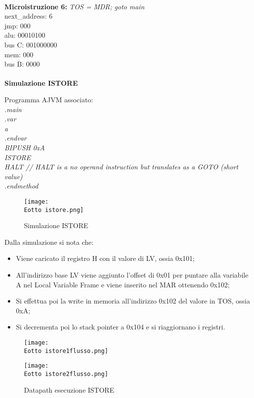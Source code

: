 \documentclass[12pt]{article}
\def \Eotto {Allegati/Esercizio8/}
\begin{document}
\\ \textbf{Microistruzione 6:}	\hspace*{1cm} \textit{TOS = MDR; goto main}
\\\hspace*{1cm} next\_address: 6
\\\hspace*{1cm} jmp: 000
\\\hspace*{1cm} alu: 00010100
\\\hspace*{1cm} bus C: 001000000
\\\hspace*{1cm} mem: 000
\\\hspace*{1cm} bus B: 0000
\\\\{\large \textbf{Simulazione ISTORE}}

\vspace{0.5cm}
Programma AJVM associato:
\textit{
    \\.main
    \\.var
    \\a
    \\.endvar
    \\BIPUSH 0xA
    \\ISTORE
    \\HALT // HALT is a no operand instruction but translates as a GOTO (short value)
    \\.endmethod
}
\clearpage
\begin{figure}[ht]
    \centering
    \texttt{[image: \\Eotto istore.png]}
    \caption{Simulazione ISTORE}
\end{figure}
Dalla simulazione si nota che:
\begin{itemize}
    \item Viene caricato il registro H con il valore di LV, ossia 0x101;
    \item All’indirizzo base LV viene aggiunto l’offset di 0x01 per puntare alla variabile A nel Local Variable Frame e viene inserito nel MAR ottenendo 0x102;
    \item Si effettua poi la write in memoria all’indirizzo 0x102 del valore in TOS, ossia 0xA;
    \item Si decrementa poi lo stack pointer a 0x104 e si riaggiornano i registri.
\end{itemize}
\clearpage
\begin{figure}[ht]
    \texttt{[image: \\Eotto istore1flusso.png]}
\end{figure}
\begin{figure}[ht]
    \texttt{[image: \\Eotto istore2flusso.png]}
    \caption{Datapath esecuzione ISTORE}
\end{figure}
\clearpage
\end{document}
